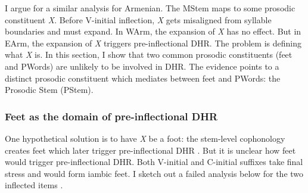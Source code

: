 I argue for a similar analysis for Armenian. The MStem maps to some prosodic constituent \textit{X}. Before V-initial inflection,  \textit{X} gets misaligned from syllable boundaries and must expand. In WArm, the expansion of \textit{X} has no effect. But in EArm, the expansion of \textit{X} triggers pre-inflectional DHR. The problem is defining what \textit{X} is. In this section, I show that two common prosodic constituents (feet and PWords) are unlikely to be involved in DHR. The evidence points to a distinct prosodic constituent which mediates between feet and PWords: the Prosodic Stem (PStem).



\subsubsection{Feet as the domain of pre-inflectional DHR}\label{disssection: reduction: destressed reduction EA: pword and feet: feet}

One hypothetical solution is to have \textit{X} be a foot: the stem-level cophonology creates  feet which later trigger  pre-inflectional DHR \citep[cf.][]{Anttila-2006-VariationOpacityFinnish}. But  it is unclear how feet would  trigger pre-inflectional DHR. Both V-initial and C-initial suffixes take final stress and would form iambic feet. I sketch out a failed analysis below for the two inflected items \textit{}.




